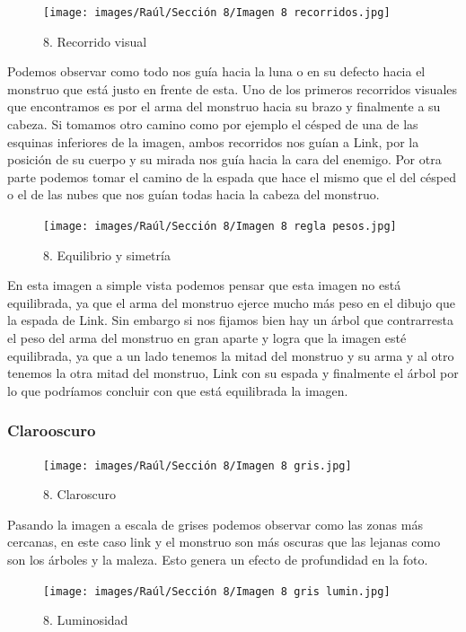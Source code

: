 \documentclass[12pt]{article}
\begin{document}
\begin{figure}[H]
      \centering
      \texttt{[image: images/Raúl/Sección 8/Imagen 8 recorridos.jpg]}
      \caption{\small 8. Recorrido visual}
    \end{figure}

Podemos observar como todo nos guía hacia la luna o en su defecto hacia el monstruo que está justo en frente de esta. Uno de los primeros recorridos visuales que encontramos es por el arma del monstruo hacia su brazo y finalmente a su cabeza. Si tomamos otro camino como por ejemplo el césped de una de las esquinas inferiores de la imagen, ambos recorridos nos guían a Link, por la posición de su cuerpo y su mirada nos guía hacia la cara del enemigo. Por otra parte podemos tomar el camino de la espada que hace el mismo que el del césped o el de las nubes que nos guían todas hacia la cabeza del monstruo.

\begin{figure}[H]
      \centering
      \texttt{[image: images/Raúl/Sección 8/Imagen 8 regla pesos.jpg]}
      \caption{\small 8. Equilibrio y simetría}
    \end{figure}

En esta imagen a simple vista podemos pensar que esta imagen no está equilibrada, ya que el arma del monstruo ejerce mucho más peso en el dibujo que la espada de Link. Sin embargo si nos fijamos bien hay un árbol que contrarresta el peso del arma del monstruo en gran aparte y logra que la imagen esté equilibrada, ya que a un lado tenemos la mitad del monstruo y su arma y al otro tenemos la otra mitad del monstruo, Link con su espada y finalmente el árbol por lo que podríamos concluir con que está equilibrada la imagen. 


        \subsubsection{Clarooscuro}

\begin{figure}[H]
      \centering
      \texttt{[image: images/Raúl/Sección 8/Imagen 8 gris.jpg]}
      \caption{\small 8. Claroscuro}
    \end{figure}

 Pasando la imagen a escala de grises podemos observar como las zonas más cercanas, en este caso link y el monstruo son más oscuras que las lejanas como son los árboles y la maleza. Esto genera un efecto de profundidad en la foto.

\begin{figure}[H]
      \centering
      \texttt{[image: images/Raúl/Sección 8/Imagen 8 gris lumin.jpg]}
      \caption{\small 8. Luminosidad}
    \end{figure}
\end{document}
